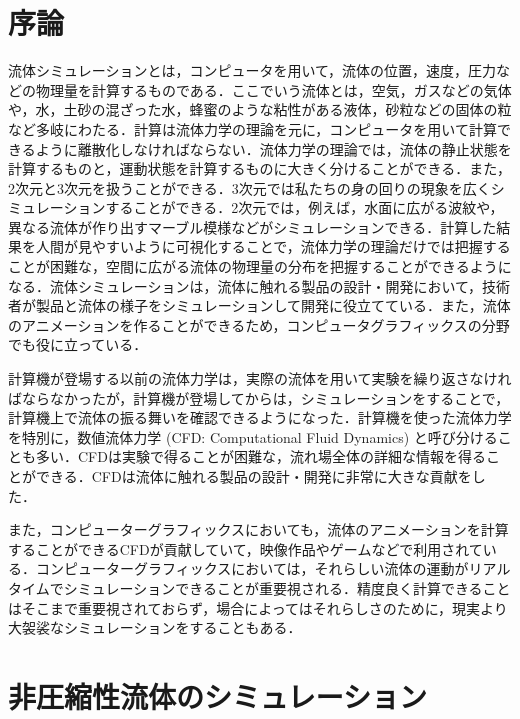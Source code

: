 \documentclass[a4j,12pt]{jreport}
\begin{document}
\tableofcontents


\newpage
{}



\chapter{序論} \label{chapter:2}

流体シミュレーションとは，コンピュータを用いて，流体の位置，速度，圧力などの物理量を計算するものである．ここでいう流体とは，空気，ガスなどの気体や，水，土砂の混ざった水，蜂蜜のような粘性がある液体，砂粒などの固体の粒など多岐にわたる．計算は流体力学の理論を元に，コンピュータを用いて計算できるように離散化しなければならない．流体力学の理論では，流体の静止状態を計算するものと，運動状態を計算するものに大きく分けることができる．また，2次元と3次元を扱うことができる．3次元では私たちの身の回りの現象を広くシミュレーションすることができる．2次元では，例えば，水面に広がる波紋や，異なる流体が作り出すマーブル模様などがシミュレーションできる．計算した結果を人間が見やすいように可視化することで，流体力学の理論だけでは把握することが困難な，空間に広がる流体の物理量の分布を把握することができるようになる．流体シミュレーションは，流体に触れる製品の設計・開発において，技術者が製品と流体の様子をシミュレーションして開発に役立てている．また，流体のアニメーションを作ることができるため，コンピュータグラフィックスの分野でも役に立っている．

計算機が登場する以前の流体力学は，実際の流体を用いて実験を繰り返さなければならなかったが，計算機が登場してからは，シミュレーションをすることで，計算機上で流体の振る舞いを確認できるようになった．計算機を使った流体力学を特別に，数値流体力学 (CFD: Computational Fluid Dynamics) と呼び分けることも多い．CFDは実験で得ることが困難な，流れ場全体の詳細な情報を得ることができる．CFDは流体に触れる製品の設計・開発に非常に大きな貢献をした．

また，コンピューターグラフィックスにおいても，流体のアニメーションを計算することができるCFDが貢献していて，映像作品やゲームなどで利用されている．コンピューターグラフィックスにおいては，それらしい流体の運動がリアルタイムでシミュレーションできることが重要視される．精度良く計算できることはそこまで重要視されておらず，場合によってはそれらしさのために，現実より大袈裟なシミュレーションをすることもある．
\chapter{非圧縮性流体のシミュレーション} \label{chapter:3}
\end{document}

